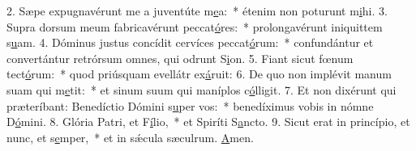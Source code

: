 2. Sæpe expugnavérunt me a juventúte m\uline{e}a:~* étenim non poturunt m\uline{i}hi.
3. Supra dorsum meum fabricavérunt peccat\uline{ó}res:~* prolongavérunt iniquittem s\uline{u}am.
4. Dóminus justus concídit cervíces peccat\uline{ó}rum:~* confundántur et convertántur retrórsum omnes, qui odrunt S\uline{i}on.
5. Fiant sicut fœnum tect\uline{ó}rum:~* quod priúsquam evellátr ex\uline{á}ruit:
6. De quo non implévit manum suam qui m\uline{e}tit:~* et sinum suum qui maníplos c\uline{ó}lligit.
7. Et non dixérunt qui præteríbant: Benedíctio Dómini s\uline{u}per vos:~* benedíximus vobis in nómne D\uline{ó}mini.
8. Glória Patri, et F\uline{í}lio,~* et Spiríti S\uline{a}ncto.
9. Sicut erat in princípio, et nunc, et s\uline{e}mper,~* et in sǽcula sæculrum. \uline{A}men.
